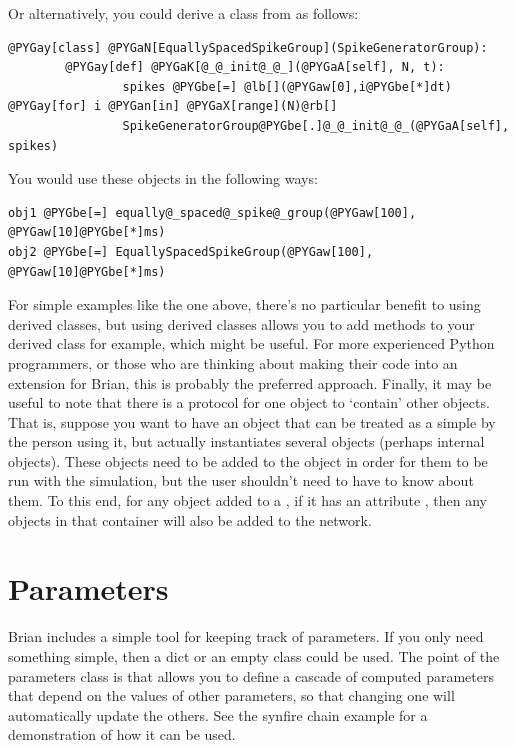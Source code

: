 \documentclass[letterpaper,10pt,english]{manual}
\begin{document}
Or alternatively, you could derive a class from \hyperlink{brian.SpikeGeneratorGroup}{}
as follows:

\begin{Verbatim}[commandchars=@\[\]]
@PYGay[class] @PYGaN[EquallySpacedSpikeGroup](SpikeGeneratorGroup):
        @PYGay[def] @PYGaK[@_@_init@_@_](@PYGaA[self], N, t):
                spikes @PYGbe[=] @lb[](@PYGaw[0],i@PYGbe[*]dt) @PYGay[for] i @PYGan[in] @PYGaX[range](N)@rb[]
                SpikeGeneratorGroup@PYGbe[.]@_@_init@_@_(@PYGaA[self], spikes)
\end{Verbatim}

You would use these objects in the following ways:

\begin{Verbatim}[commandchars=@\[\]]
obj1 @PYGbe[=] equally@_spaced@_spike@_group(@PYGaw[100], @PYGaw[10]@PYGbe[*]ms)
obj2 @PYGbe[=] EquallySpacedSpikeGroup(@PYGaw[100], @PYGaw[10]@PYGbe[*]ms)
\end{Verbatim}

For simple examples like the one above, there's no particular benefit to
using derived classes, but using derived classes allows you to add
methods to your derived class for example, which might be useful. For
more experienced Python programmers, or those who are thinking about
making their code into an extension for Brian, this is probably the
preferred approach.
Finally, it may be useful to note that there is a protocol for one object
to `contain' other objects. That is, suppose you want to have an object
that can be treated as a simple \hyperlink{brian.NeuronGroup}{} by the person using it,
but actually instantiates several objects (perhaps internal \hyperlink{brian.Connection}{}
objects). These objects need to be added to the \hyperlink{brian.Network}{} object
in order for them to be run with the simulation, but the user shouldn't need
to have to know about them. To this end, for any object added to a
\hyperlink{brian.Network}{}, if it has an attribute , then any
objects in that container will also be added to the network.

\resetcurrentobjects


\section{Parameters}

Brian includes a simple tool for keeping track of parameters. If you only need
something simple, then a dict or an empty class could be used. The point of the
parameters class is that allows you to define a cascade of computed parameters
that depend on the values of other parameters, so that changing one will
automatically update the others. See the synfire chain example
 for a demonstration of how it can be used.
\end{document}
